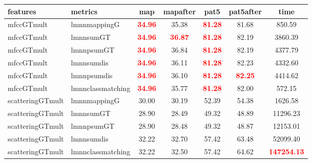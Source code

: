 \begin{tabular}{llccccc} 
features & metrics & map & mapafter & pat5 & pat5after & time \\ 
\hline 
mfccGTmult & lmnnmappingG & \textbf{\textcolor{red}{34.96}} & 35.38 & \textbf{\textcolor{red}{81.28}} & 81.68 &    850.59 \\ 
mfccGTmult & lmnnsumGT & \textbf{\textcolor{red}{34.96}} & \textbf{\textcolor{red}{36.87}} & \textbf{\textcolor{red}{81.28}} & 82.19 &   3860.39 \\ 
mfccGTmult & lmnnpsumGT & \textbf{\textcolor{red}{34.96}} & 36.84 & \textbf{\textcolor{red}{81.28}} & 82.19 &   4377.79 \\ 
mfccGTmult & lmnnsumdis & \textbf{\textcolor{red}{34.96}} & 36.11 & \textbf{\textcolor{red}{81.28}} & 82.23 &   4332.60 \\ 
mfccGTmult & lmnnpsumdis & \textbf{\textcolor{red}{34.96}} & 36.10 & \textbf{\textcolor{red}{81.28}} & \textbf{\textcolor{red}{82.25}} &   4414.62 \\ 
mfccGTmult & lmnnclassmatching & \textbf{\textcolor{red}{34.96}} & 35.77 & \textbf{\textcolor{red}{81.28}} & 82.00 &    572.15 \\ 
scatteringGTmult & lmnnmappingG & 30.00 & 30.19 & 52.39 & 54.38 &   1626.58 \\ 
scatteringGTmult & lmnnsumGT & 28.90 & 28.49 & 49.32 & 48.89 &  11296.23 \\ 
scatteringGTmult & lmnnpsumGT & 28.90 & 28.48 & 49.32 & 48.87 &  12153.01 \\ 
scatteringGTmult & lmnnsumdis & 32.22 & 32.70 & 57.42 & 63.48 &  52099.40 \\ 
scatteringGTmult & lmnnclassmatching & 32.22 & 32.50 & 57.42 & 64.62 & \textbf{\textcolor{red}{147254.13}} \\ 
\end{tabular} 
